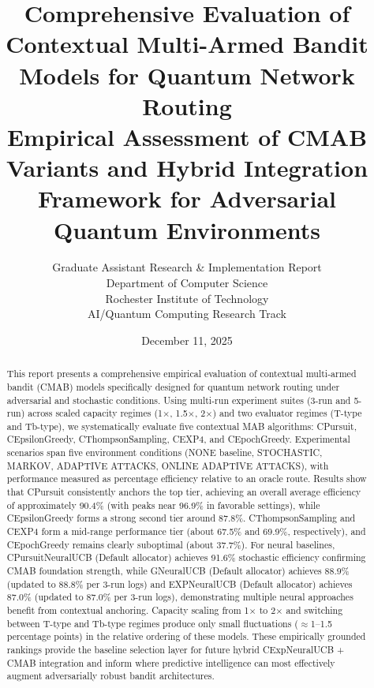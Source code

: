 \documentclass[12pt,a4paper]{article}
\title{\textbf{Comprehensive Evaluation of Contextual Multi-Armed Bandit Models for Quantum Network Routing}\\
\large{Empirical Assessment of CMAB Variants and Hybrid Integration Framework for Adversarial Quantum Environments}}
\author{Graduate Assistant Research \& Implementation Report\\ 
Department of Computer Science \\ 
Rochester Institute of Technology \\ 
AI/Quantum Computing Research Track}
\date{December 11, 2025}
\begin{document}
\maketitle

\begin{abstract}
This report presents a comprehensive empirical evaluation of contextual multi-armed bandit (CMAB) models specifically designed for quantum network routing under adversarial and stochastic conditions. Using multi-run experiment suites (3-run and 5-run) across scaled capacity regimes (1$\times$, 1.5$\times$, 2$\times$) and two evaluator regimes (T-type and Tb-type), we systematically evaluate five contextual MAB algorithms: CPursuit, CEpsilonGreedy, CThompsonSampling, CEXP4, and CEpochGreedy. Experimental scenarios span five environment conditions (NONE baseline, STOCHASTIC, MARKOV, ADAPTIVE ATTACKS, ONLINE ADAPTIVE ATTACKS), with performance measured as percentage efficiency relative to an oracle route. Results show that CPursuit consistently anchors the top tier, achieving an overall average efficiency of approximately 90.4\% (with peaks near 96.9\% in favorable settings), while CEpsilonGreedy forms a strong second tier around 87.8\%. CThompsonSampling and CEXP4 form a mid-range performance tier (about 67.5\% and 69.9\%, respectively), and CEpochGreedy remains clearly suboptimal (about 37.7\%). For neural baselines, CPursuitNeuralUCB (Default allocator) achieves 91.6\% stochastic efficiency confirming CMAB foundation strength, while GNeuralUCB (Default allocator) achieves 88.9\% (updated to 88.8\% per 3-run logs) and EXPNeuralUCB (Default allocator) achieves 87.0\% (updated to 87.0\% per 3-run logs), demonstrating multiple neural approaches benefit from contextual anchoring. Capacity scaling from 1$\times$ to 2$\times$ and switching between T-type and Tb-type regimes produce only small fluctuations ($\approx$1--1.5 percentage points) in the relative ordering of these models. These empirically grounded rankings provide the baseline selection layer for future hybrid CExpNeuralUCB + CMAB integration and inform where predictive intelligence can most effectively augment adversarially robust bandit architectures.
\end{abstract}

\newpage
{\tableofcontents}

\newpage
\end{document}

